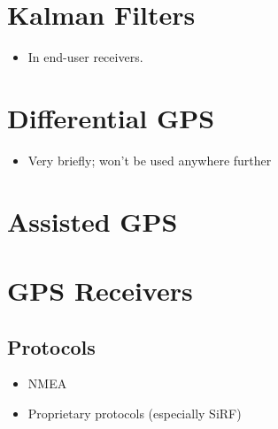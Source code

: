 \section{Kalman Filters}
\begin{itemize}
\item In end-user receivers.
\end{itemize}

\section{Differential GPS}
\begin{itemize}
\item Very briefly; won't be used anywhere further
\end{itemize}

\section{Assisted GPS}

\section{GPS Receivers}
\subsection{Protocols}
\begin{itemize}
\item NMEA
\item Proprietary protocols (especially SiRF)
\end{itemize}


